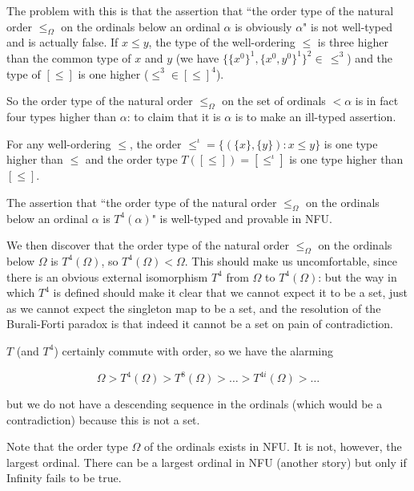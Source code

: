 \documentclass{slides}
\begin{document}
\begin{slide}

The problem with this is that the assertion that  ``the order type of the natural order $\leq_{\Omega}$  on the ordinals below an ordinal $\alpha$ is obviously $\alpha$" is not well-typed and is actually false.  If $x \leq y$, the type of the well-ordering $\leq$ is three higher than the common type of $x$ and $y$ (we have $\{\{x^0\}^1,\{x^0,y^0\}^1\}^2 \in \, \leq^3$)
and the type of $[\leq]$  is one higher ($\leq^3 \in [\leq]^4$).

So the order type of the natural order $\leq_{\Omega}$ on the set of ordinals $<\alpha$ is in fact four types higher than $\alpha$:  to claim that it is $\alpha$ is to make an ill-typed assertion.

For any well-ordering $\leq$, the order $\leq^{\iota} = \{(\{x\},\{y\}):x \leq y\}$ is one type higher than $\leq$ and the order type $T([\leq]) = [\leq^{\iota}]$ is one type higher
than $[\leq]$.

The assertion that  ``the order type of the natural order $\leq_{\Omega}$  on the ordinals below an ordinal $\alpha$ is $T^4(\alpha)$" is well-typed and provable in NFU.

\end{slide}

\begin{slide}

We then discover that the order type of the natural order $\leq_{\Omega}$ on the ordinals below $\Omega$ is $T^4(\Omega)$, so $T^4(\Omega) < \Omega$.
This should make us uncomfortable, since there is an obvious external isomorphism $T^4$ from $\Omega$ to $T^4(\Omega)$:  but the way in which $T^4$ is defined
should make it clear that we cannot expect it to be a set, just as we cannot expect the singleton map to be a set, and the resolution of the Burali-Forti paradox is that indeed it cannot be a set on pain of contradiction.

$T$ (and $T^4$) certainly commute with order, so we have the alarming

$$\Omega > T^4(\Omega) > T^8(\Omega) > \ldots> T^{4i}(\Omega) >\ldots$$

but we do not have a descending sequence in the ordinals (which would be a contradiction) because this is not a set.

\end{slide}

\begin{slide}

Note that the order type $\Omega$ of the ordinals exists in NFU.  It is not, however, the largest ordinal.  There can be a largest ordinal in NFU (another story) but only
if Infinity fails to be true.

\end{slide}
\end{document}
